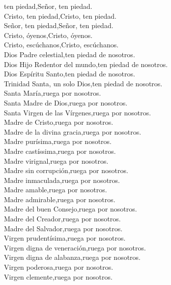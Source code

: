 ten piedad,\hfill Señor, ten piedad.\\
Cristo, ten piedad,\hfill Cristo, ten piedad.\\
Señor, ten piedad,\hfill Señor, ten piedad.\\
Cristo, óyenos,\hfill Cristo, óyenos.\\
Cristo, escúchanos,\hfill Cristo, escúchanos.\\
Dios Padre celestial,\hfill ten piedad de nosotros.\\
Dios Hijo Redentor del mundo,\hfill ten piedad de nosotros.\\
Dios Espíritu Santo,\hfill ten piedad de nosotros.\\
Trinidad Santa, un solo Dios,\hfill ten piedad de nosotros.\\
Santa María,\hfill ruega por nosotros.\\
Santa Madre de Dios,\hfill ruega por nosotros.\\
Santa Virgen de las Vírgenes,\hfill ruega por nosotros.\\
Madre de Cristo,\hfill ruega por nosotros.\\
Madre de la divina gracia,\hfill ruega por nosotros.\\
Madre purísima,\hfill ruega por nosotros.\\
Madre castíssima,\hfill ruega por nosotros.\\
Madre virignal,\hfill ruega por nosotros.\\
Madre sin corrupción,\hfill ruega por nosotros.\\
Madre inmaculada,\hfill ruega por nosotros.\\
Madre amable,\hfill ruega por nosotros.\\
Madre admirable,\hfill ruega por nosotros.\\
Madre del buen Consejo,\hfill ruega por nosotros.\\
Madre del Creador,\hfill ruega por nosotros.\\
Madre del Salvador,\hfill ruega por nosotros.\\
Virgen prudentísima,\hfill ruega por nosotros.\\
Virgen digna de veneración,\hfill ruega por nosotros.\\
Virgen digna de alabanza,\hfill ruega por nosotros.\\
Virgen poderosa,\hfill ruega por nosotros.\\
Virgen clemente,\hfill ruega por nosotros.\\
